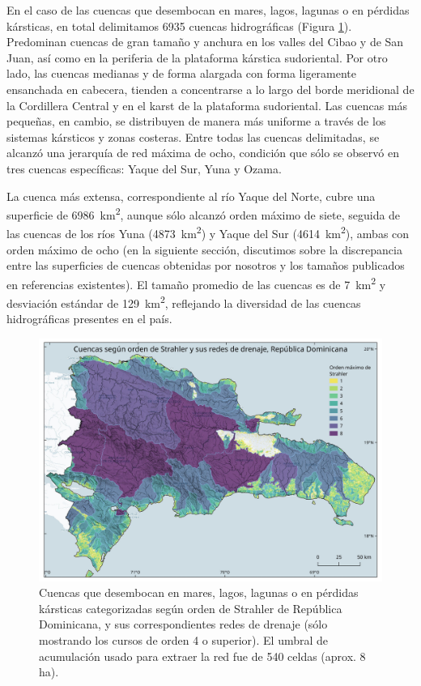 \documentclass[spanish]{article}
\begin{document}
En el caso de las cuencas que desembocan en mares, lagos, lagunas o en
pérdidas kársticas, en total delimitamos 6935 cuencas hidrográficas
(Figura \ref{fig:cuencasordenestodas}). Predominan cuencas de gran
tamaño y anchura en los valles del Cibao y de San Juan, así como en la
periferia de la plataforma kárstica sudoriental. Por otro lado, las
cuencas medianas y de forma alargada con forma ligeramente ensanchada en
cabecera, tienden a concentrarse a lo largo del borde meridional de la
Cordillera Central y en el karst de la plataforma sudoriental. Las
cuencas más pequeñas, en cambio, se distribuyen de manera más uniforme a
través de los sistemas kársticos y zonas costeras. Entre todas las
cuencas delimitadas, se alcanzó una jerarquía de red máxima de ocho,
condición que sólo se observó en tres cuencas específicas: Yaque del
Sur, Yuna y Ozama.

La cuenca más extensa, correspondiente al río Yaque del Norte, cubre una
superficie de 6986~km\textsuperscript{2}, aunque sólo alcanzó orden
máximo de siete, seguida de las cuencas de los ríos Yuna
(4873~km\textsuperscript{2}) y Yaque del Sur
(4614~km\textsuperscript{2}), ambas con orden máximo de ocho (en la
siguiente sección, discutimos sobre la discrepancia entre las
superficies de cuencas obtenidas por nosotros y los tamaños publicados
en referencias existentes). El tamaño promedio de las cuencas es de
7~km\textsuperscript{2} y desviación estándar de
129~km\textsuperscript{2}, reflejando la diversidad de las cuencas
hidrográficas presentes en el país.

\begin{figure}

{\centering \includegraphics[width=1\linewidth]{figuras/cuencas-ordenes-todas} 

}

\caption{Cuencas que desembocan en mares, lagos, lagunas o en pérdidas kársticas categorizadas según orden de Strahler de República Dominicana, y sus correspondientes redes de drenaje (sólo mostrando los cursos de orden 4 o superior). El umbral de acumulación usado para extraer la red fue de 540 celdas (aprox. 8 ha).}\label{fig:cuencasordenestodas}
\end{figure}
\end{document}
